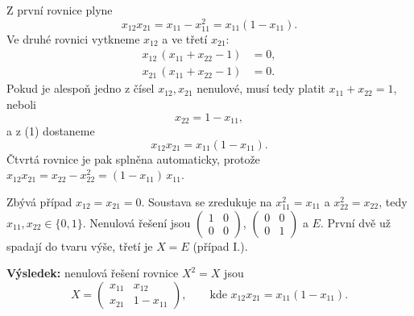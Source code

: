 \documentclass[12pt,a4paper]{article}
\begin{document}
\begin{enumerate}
  Z první rovnice plyne
  \begin{equation}
  x_{12}x_{21} = x_{11}-x_{11}^{2} = x_{11}(1-x_{11}).
  \end{equation}
  Ve druhé rovnici vytkneme $x_{12}$ a ve třetí $x_{21}$:
  \begin{align}
  x_{12}\,(x_{11}+x_{22}-1) &= 0,\\
  x_{21}\,(x_{11}+x_{22}-1) &= 0.
  \end{align}
  Pokud je alespoň jedno z čísel $x_{12}, x_{21}$ nenulové, musí tedy platit
  $x_{11}+x_{22}=1$, neboli
  \begin{equation}
  x_{22} = 1-x_{11},
  \end{equation}
  a z (1) dostaneme
  \begin{equation}
  x_{12}x_{21} = x_{11}(1-x_{11}).
  \end{equation}
  Čtvrtá rovnice je pak splněna automaticky, protože
  $x_{12}x_{21}=x_{22}-x_{22}^{2}=(1-x_{11})\,x_{11}$.

  Zbývá případ $x_{12}=x_{21}=0$. Soustava se zredukuje na $x_{11}^{2}=x_{11}$ a $x_{22}^{2}=x_{22}$,
  tedy $x_{11},x_{22}\in\{0,1\}$. Nenulová řešení jsou
  $\begin{pmatrix} 1 & 0\\ 0 & 0\end{pmatrix}$,
  $\begin{pmatrix} 0 & 0\\ 0 & 1\end{pmatrix}$ a $E$.
  První dvě už spadají do tvaru výše, třetí je $X=E$ (případ I.).

  \textbf{Výsledek:} nenulová řešení rovnice $X^{2}=X$ jsou
  \[
  X=\begin{pmatrix} x_{11} & x_{12}\\ x_{21} & 1-x_{11}\end{pmatrix},
  \qquad\text{kde } x_{12}x_{21}=x_{11}(1-x_{11}).
  \]
  
\end{enumerate}
\end{document}
